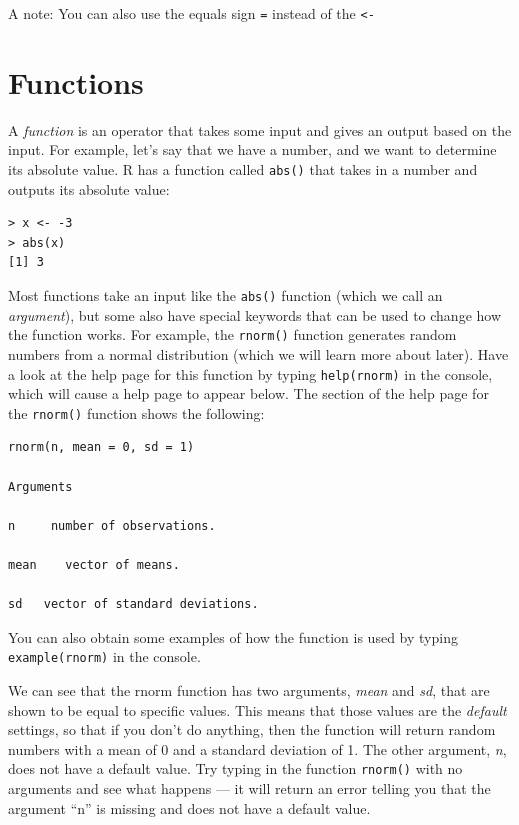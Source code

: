 \documentclass[12pt,]{book}
\begin{document}
A note: You can also use the equals sign \texttt{=} instead of the \texttt{\textless{}-}

\hypertarget{functions}{%
\section{Functions}\label{functions}}

A \emph{function} is an operator that takes some input and gives an output based on the input. For example, let's say that we have a number, and we want to determine its absolute value. R has a function called \texttt{abs()} that takes in a number and outputs its absolute value:

\begin{verbatim}
> x <- -3
> abs(x)
[1] 3
\end{verbatim}

Most functions take an input like the \texttt{abs()} function (which we call an \emph{argument}), but some also have special keywords that can be used to change how the function works. For example, the \texttt{rnorm()} function generates random numbers from a normal distribution (which we will learn more about later). Have a look at the help page for this function by typing \texttt{help(rnorm)} in the console, which will cause a help page to appear below. The section of the help page for the \texttt{rnorm()} function shows the following:

\begin{verbatim}
rnorm(n, mean = 0, sd = 1)

Arguments

n     number of observations. 

mean    vector of means.

sd   vector of standard deviations.
\end{verbatim}

You can also obtain some examples of how the function is used by typing \texttt{example(rnorm)} in the console.

We can see that the rnorm function has two arguments, \emph{mean} and \emph{sd}, that are shown to be equal to specific values. This means that those values are the \emph{default} settings, so that if you don't do anything, then the function will return random numbers with a mean of 0 and a standard deviation of 1. The other argument, \emph{n}, does not have a default value. Try typing in the function \texttt{rnorm()} with no arguments and see what happens --- it will return an error telling you that the argument ``n'' is missing and does not have a default value.
\end{document}
